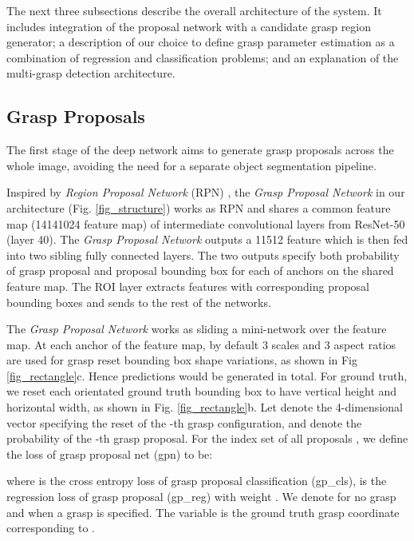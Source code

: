\documentclass[letterpaper, 10 pt, journal, twoside]{IEEEtran}
\begin{document}
The next three subsections describe the overall architecture of the
system.  It includes integration of the proposal network with a
candidate grasp region generator; a description of our choice to define
grasp parameter estimation as a combination of regression and
classification problems; and an explanation of the multi-grasp detection
architecture.    

\subsection{Grasp Proposals}




The first stage of the deep network aims to generate grasp proposals across
the whole image, avoiding the need for a separate object segmentation
pipeline. 

Inspired by \emph{Region Proposal Network} (RPN) \cite{ren2015faster}, 
the \emph{Grasp Proposal Network} in our architecture (Fig. \ref{fig_structure}) works as RPN and shares a common
feature map (14141024 feature map) of intermediate convolutional layers from ResNet-50 (layer 40). The \emph{Grasp Proposal Network} outputs a
11512 feature which is then fed into two sibling fully connected layers. The
two outputs specify both probability of grasp proposal and proposal bounding
box for each of  anchors on the shared feature map. The ROI layer extracts features with corresponding proposal bounding boxes and sends to the rest of the networks.

The \emph{Grasp Proposal Network} works as sliding a mini-network
over the feature map.  
At each anchor of the feature map, by default 3 scales and 3 aspect ratios are used for grasp
reset bounding box shape variations, as shown in Fig \ref{fig_rectangle}c.  Hence  predictions would be generated in total. For ground truth, we reset each orientated ground truth bounding box to have vertical height and
horizontal width, as shown in Fig. \ref{fig_rectangle}b. Let  denote the
4-dimensional vector specifying the reset  of the -th grasp
configuration, and  denote the probability of the -th grasp
proposal. 
For the index set of all proposals ,
we define the loss of grasp proposal net (gpn) to be: 

where  is the cross entropy loss of grasp proposal
classification (gp\_cls),  is the  regression loss of
grasp proposal (gp\_reg) with weight . 
We denote  for no grasp and  when
a grasp is specified. The variable  is the ground truth grasp
coordinate corresponding to . 
\end{document}
